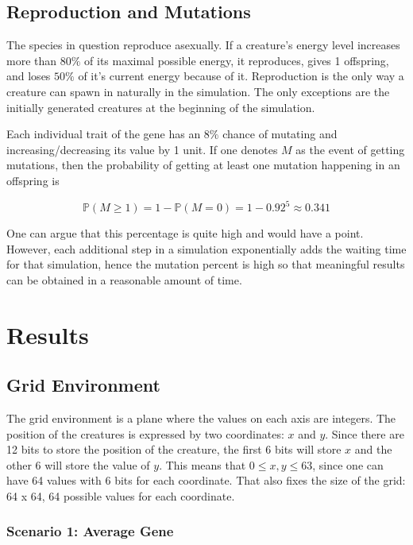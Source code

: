 \documentclass{article}
\begin{document}
\subsection{Reproduction and Mutations}

The species in question reproduce asexually. If a creature's energy level increases more than $80\%$ of its maximal possible energy, it reproduces, gives 1 offspring, and loses $50\%$ of it's current energy because of it. Reproduction is the only way a creature can spawn in naturally in the simulation. The only exceptions are the initially generated creatures at the beginning of the simulation.

Each individual trait of the gene has an $8\%$ chance of mutating and increasing/decreasing its value by 1 unit. If one denotes $M$ as the event of getting mutations, then the probability of getting at least one mutation happening in an offspring is

\[
    \mathbb{P}(M \geq 1) = 1 - \mathbb{P}(M = 0) = 1 - 0.92^5 \approx 0.341 
\]

One can argue that this percentage is quite high and would have a point. However, each additional step in a simulation exponentially adds the waiting time for that simulation, hence the mutation percent is high so that meaningful results can be obtained in a reasonable amount of time.

\newpage

\section{Results}

\subsection{Grid Environment}

The grid environment is a plane where the values on each axis are integers. The position of the creatures is expressed by two coordinates: $x$ and $y$. Since there are 12 bits to store the position of the creature, the first 6 bits will store $x$ and the other 6 will store the value of $y$. This means that $0 \leq x, y \leq 63$, since one can have 64 values with 6 bits for each coordinate. That also fixes the size of the grid: 64 x 64, 64 possible values for each coordinate.

\subsubsection{Scenario 1: Average Gene}
\end{document}
